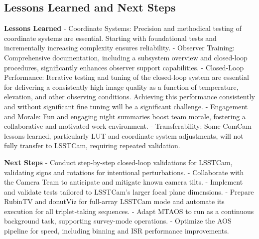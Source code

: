\subsection{Lessons Learned and Next Steps}
\textbf{Lessons Learned}
- Coordinate Systems: Precision and methodical testing of coordinate systems are essential. 
Starting with foundational tests and incrementally increasing complexity ensures reliability.
- Observer Training: Comprehensive documentation, including a subsystem overview and closed-loop procedures, 
significantly enhances observer support capabilities.
- Closed-Loop Performance: Iterative testing and tuning of the closed-loop system are essential for delivering a consistently high image quality as a function of temperature, elevation, and other observing conditions. Achieving this performance consistently and without significant fine tuning will be a significant challenge.
- Engagement and Morale: Fun and engaging night summaries boost team morale, fostering a collaborative 
and motivated work environment.
- Transferability: Some ComCam lessons learned, particularly LUT and coordinate system adjustments, 
will not fully transfer to LSSTCam, requiring repeated validation.

\textbf{Next Steps}
- Conduct step-by-step closed-loop validations for LSSTCam, validating signs and rotations for intentional perturbations.
- Collaborate with the Camera Team to anticipate and mitigate known camera tilts.
- Implement and validate tests tailored to LSSTCam's larger focal plane dimensions.
- Prepare RubinTV and donutViz for full-array LSSTCam mode and automate its execution for all triplet-taking sequences.
- Adapt MTAOS to run as a continuous background task, supporting survey-mode operations.
- Optimize the AOS pipeline for speed, including binning and ISR performance improvements.



